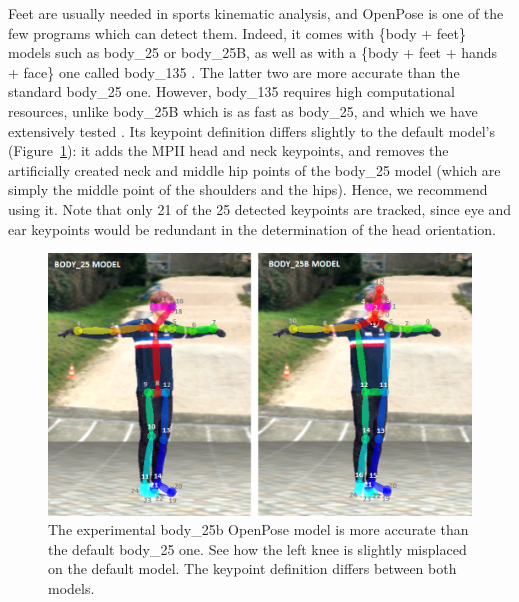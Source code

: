 Feet are usually needed in sports kinematic analysis, and OpenPose is one of the few programs which can detect them. Indeed, it comes with \{body + feet\} models such as body\_25 or body\_25B, as well as with a \{body + feet + hands + face\} one called body\_135 \cite{Hidalgo2019}. The latter two are more accurate than the standard body\_25 one. However, body\_135 requires high computational resources, unlike body\_25B which is as fast as body\_25, and which we have extensively tested \cite{Pagnon2022a}. Its keypoint definition differs slightly to the default model's (Figure~\ref{fig_body25b}): it adds the MPII head and neck keypoints, and removes the artificially created neck and middle hip points of the body\_25 model (which are simply the middle point of the shoulders and the hips). Hence, we recommend using it. Note that only 21 of the 25 detected keypoints are tracked, since eye and ear keypoints would be redundant in the determination of the head orientation. 

\begin{figure}[!ht]
	\centering
	\def\svgwidth{1\columnwidth}
	\fontsize{10pt}{10pt}\selectfont
	\includegraphics[width=\linewidth]{"../Chap3/Figures/Fig_Body25b.png"}
	\caption{The experimental body\_25b OpenPose model is more accurate than the default body\_25 one. See how the left knee is slightly misplaced on the default model. The keypoint definition differs between both models.}
	\label{fig_body25b}
\end{figure}

